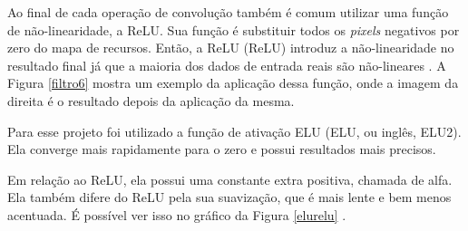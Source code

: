 Ao final de cada operação de convolução também é comum utilizar uma função de não-linearidade, a ReLU. Sua função é substituir todos os \textit{pixels} negativos por zero do mapa de recursos. Então, a \acrlong{ReLU} (ReLU) introduz a não-linearidade no resultado final já que a maioria dos dados de entrada reais são não-lineares \cite{conv2}.
A Figura \ref{filtro6} mostra um exemplo da aplicação dessa função, onde a imagem da direita é o resultado depois da aplicação da mesma.

\begin{figure}[H]
	\centering
\end{figure}

Para esse projeto foi utilizado a função de ativação ELU (\acrlong{ELU}, ou inglês, \acrlong{ELU2}). Ela converge mais rapidamente para o zero e possui resultados mais precisos.

Em relação ao ReLU, ela possui uma constante extra positiva, chamada de alfa. Ela também difere do ReLU pela sua suavização, que é mais lente e bem menos acentuada. É possível ver isso no gráfico da Figura \ref{elurelu} \cite{elu}.

\begin{figure}[H]
	\centering
\end{figure}

